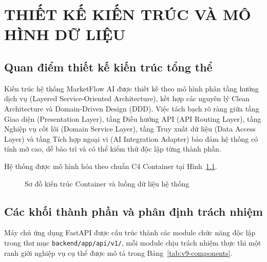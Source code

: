 \chapter{THIẾT KẾ KIẾN TRÚC VÀ MÔ HÌNH DỮ LIỆU}

\section{Quan điểm thiết kế kiến trúc tổng thể}

Kiến trúc hệ thống MarketFlow AI được thiết kế theo mô hình phân tầng hướng dịch vụ (Layered Service-Oriented Architecture), kết hợp các nguyên lý Clean Architecture và Domain-Driven Design (DDD). Việc tách bạch rõ ràng giữa tầng Giao diện (Presentation Layer), tầng Điều hướng API (API Routing Layer), tầng Nghiệp vụ cốt lõi (Domain Service Layer), tầng Truy xuất dữ liệu (Data Access Layer) và tầng Tích hợp ngoại vi (AI Integration Adapter) bảo đảm hệ thống có tính mở cao, dễ bảo trì và có thể kiểm thử độc lập từng thành phần.

Hệ thống được mô hình hóa theo chuẩn C4 Container tại Hình~\ref{fig:v9-container}.

\begin{figure}[H]
\centering

\caption{Sơ đồ kiến trúc Container và luồng dữ liệu hệ thống}
\label{fig:v9-container}
\end{figure}

\section{Các khối thành phần và phân định trách nhiệm}

Máy chủ ứng dụng FastAPI được cấu trúc thành các module chức năng độc lập trong thư mục \texttt{backend/app/api/v1/}, mỗi module chịu trách nhiệm thực thi một ranh giới nghiệp vụ cụ thể được mô tả trong Bảng~\ref{tab:v9-components}.

